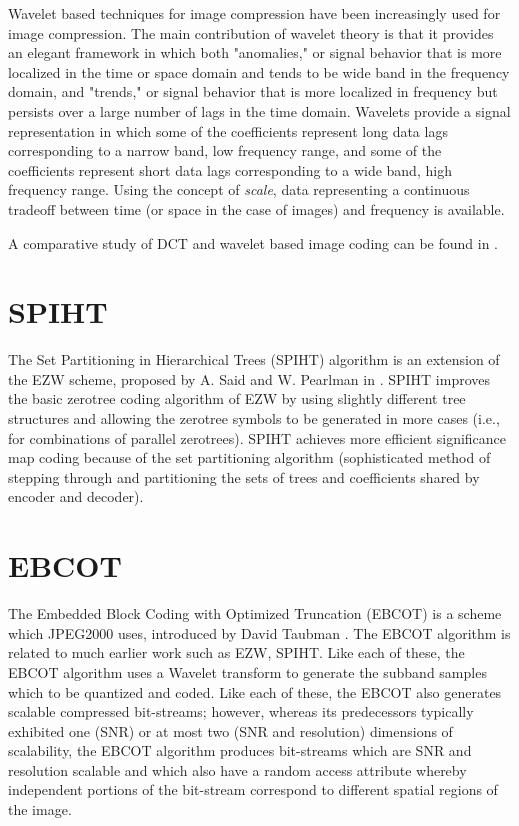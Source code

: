 \documentclass[article,oneside]{memoir}
\begin{document}
Wavelet based techniques for image compression have been increasingly used for image compression. 
The main contribution of wavelet theory is that it provides an elegant framework in which both "anomalies," or signal behavior that is more localized in the time or space domain and tends to be wide band in the frequency domain, and "trends," or signal behavior that is more localized in frequency but persists over a large number of lags in the time domain. 
Wavelets provide a signal representation in which some of the coefficients represent long data lags corresponding to a narrow band, low frequency range, and some of the coefficients represent short data lags corresponding to a wide band, high frequency range. Using the concept of \textit{scale}, data representing a continuous tradeoff between time (or space in the case of images) and frequency is available. 

A comparative study of DCT and wavelet based image coding can be found in \cite{Xiong}. 

\section{SPIHT}

The Set Partitioning in Hierarchical Trees (SPIHT) algorithm is  an extension of the EZW scheme, proposed by A. Said and W. Pearlman in \cite{Said}. SPIHT improves the basic zerotree coding algorithm of EZW by using slightly different tree structures and allowing the zerotree symbols to be generated in more cases (i.e., for combinations of parallel zerotrees). SPIHT achieves more efficient significance map coding because of the set partitioning algorithm (sophisticated method of stepping through and partitioning the sets of trees and coefficients shared by encoder and decoder).

\section{EBCOT}

The Embedded Block Coding with Optimized Truncation (EBCOT) is a scheme which JPEG2000 uses, introduced by David Taubman \cite{Taubman}. The EBCOT algorithm is related to much earlier work such as EZW, SPIHT. Like each of these, the EBCOT algorithm uses a Wavelet transform to generate the subband samples which to be quantized and coded. Like each of these, the EBCOT also generates scalable  compressed bit-streams; however, whereas its predecessors typically exhibited one (SNR) or at most two (SNR and resolution) dimensions of scalability, the EBCOT algorithm produces bit-streams which are SNR and resolution scalable and which also have a random access attribute whereby independent portions of the bit-stream correspond to different spatial regions of the image. 
\end{document}
